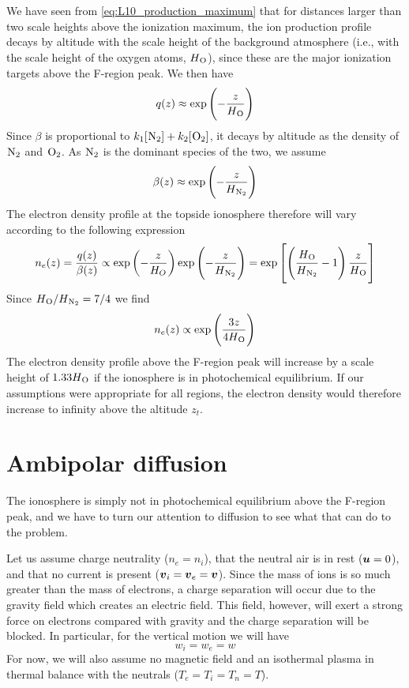 We have seen from \cref{eq:L10_production_maximum} that for distances larger than two scale heights above the ionization maximum, the ion production profile decays by altitude with the scale height of the background atmosphere (i.e., with the scale height of the oxygen atoms, \(H_{\prescript{}{}{\textnormal{O}}}\)), since these are the major ionization targets above the F-region peak. We then have
\begin{equation*}
    q(z)\approx\exp\left(-\frac{z}{H_{\prescript{}{}{\textnormal{O}}}}\right)
\end{equation*}
Since \(\beta \) is proportional to \(k_1[\prescript{}{}{\textnormal{N}}_2]+k_2[\prescript{}{}{\textnormal{O}}_2]\), it decays by altitude as the density of \(\prescript{}{}{\textnormal{N}}_2\) and \(\prescript{}{}{\textnormal{O}}_2\). As \(\prescript{}{}{\textnormal{N}}_2\) is the dominant species of the two, we assume
\begin{equation*}
    \beta(z)\approx\exp\left(-\frac{z}{H_{\prescript{}{}{\textnormal{N}}_2}}\right)
\end{equation*}
The electron density profile at the topside ionosphere therefore will vary according to the following expression
\begin{equation*}
    n_e(z)=\frac{q(z)}{\beta(z)}\propto \exp\left(-\frac{z}{H_O}\right)\exp\left(-\frac{z}{H_{\prescript{}{}{\textnormal{N}}_2}}\right)=\exp\left[\left(\frac{H_{\prescript{}{}{\textnormal{O}}}}{H_{\prescript{}{}{\textnormal{N}}_2}}-1\right)\frac{z}{H_{\prescript{}{}{\textnormal{O}}}}\right]
\end{equation*}
Since \(H_{\prescript{}{}{\textnormal{O}}}/H_{\prescript{}{}{\textnormal{N}}_2}=7/4\) we find
\begin{equation*}
    n_e(z)\propto\exp\left(\frac{3z}{4H_{\prescript{}{}{\textnormal{O}}}}\right)
\end{equation*}
The electron density profile above the F-region peak will increase by a scale height of \(1.33H_{\prescript{}{}{\textnormal{O}}}\) if the ionosphere is in photochemical equilibrium. If our assumptions were appropriate for all regions, the electron density would therefore increase to infinity above the altitude \(z_t\).

\section{Ambipolar diffusion}
The ionosphere is simply not in photochemical equilibrium above the F-region peak, and we have to turn our attention to diffusion to see what that can do to the problem.

Let us assume charge neutrality (\(n_e=n_i\)), that the neutral air is in rest (\(\boldsymbol{u}=0\)), and that no current is present (\(\boldsymbol{v}_i=\boldsymbol{v}_e=\boldsymbol{v}\)). Since the mass of ions is so much greater than the mass of electrons, a charge separation will occur due to the gravity field which creates an electric field. This field, however, will exert a strong force on electrons compared with gravity and the charge separation will be blocked. In particular, for the vertical motion we will have
\begin{equation*}
    w_i=w_e=w
\end{equation*}
For now, we will also assume no magnetic field and an isothermal plasma in thermal balance with the neutrals (\(T_e=T_i=T_n=T\)).


